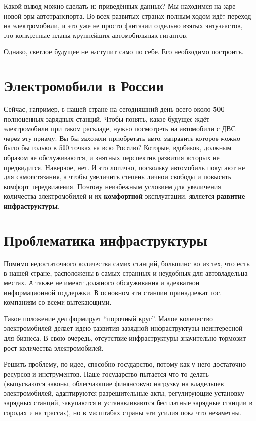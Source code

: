\documentclass[a4paper,12pt]{report}
\begin{document}
Какой вывод можно сделать из приведённых данных? Мы находимся на заре новой эры автотранспорта. Во всех развитых странах полным ходом идёт переход на электромобили, и это уже не просто фантазии отдельно взятых энтузиастов, это конкретные планы крупнейших автомобильных гигантов. 

Однако, светлое будущее не наступит само по себе. Его необходимо построить. 

\section{Электромобили в России}
Сейчас, например, в нашей стране на сегодняшний день всего около \textbf{500} полноценных зарядных станций. Чтобы понять, какое будущее ждёт электромобили при таком раскладе, нужно посмотреть на автомобили с ДВС через эту призму. Вы бы захотели приобретать авто, заправить которое можно было бы только в 500 точках на всю Россию? Которые, вдобавок, должным образом не обслуживаются, и внятных перспектив развития которых не предвидится. Наверное, нет. И это логично, поскольку автомобиль покупают не для самоистязания, а чтобы увеличить степень личной свободы и повысить комфорт передвижения. Поэтому неизбежным условием для увеличения количества электромобилей и их \textbf{комфортной} эксплуатации, является \textbf{развитие инфраструктуры}. 

\section{Проблематика инфраструктуры}
Помимо недостаточного количества самих станций, большинство из тех, что есть в нашей стране, расположены в самых странных и неудобных для автовладельца местах. А также не имеют должного обслуживания и адекватной информационной поддержки. В основном эти станции принадлежат гос. компаниям со всеми вытекающими.

Такое положение дел формирует “порочный круг”. Малое количество электромобилей делает идею развития зарядной инфраструктуры неинтересной для бизнеса. В свою очередь, отсутствие инфраструктуры значительно тормозит рост количества электромобилей. 

Решить проблему, по идее, способно государство, потому как у него достаточно ресурсов и инструментов. Наше государство пытается что-то делать (выпускаются законы, облегчающие финансовую нагрузку на владельцев электромобилей, адаптируются разрешительные акты, регулирующие установку зарядных станций, закупаются и устанавливаются бесплатные зарядные станции в городах и на трассах), но в масштабах страны эти усилия пока что незаметны. 
\end{document}
